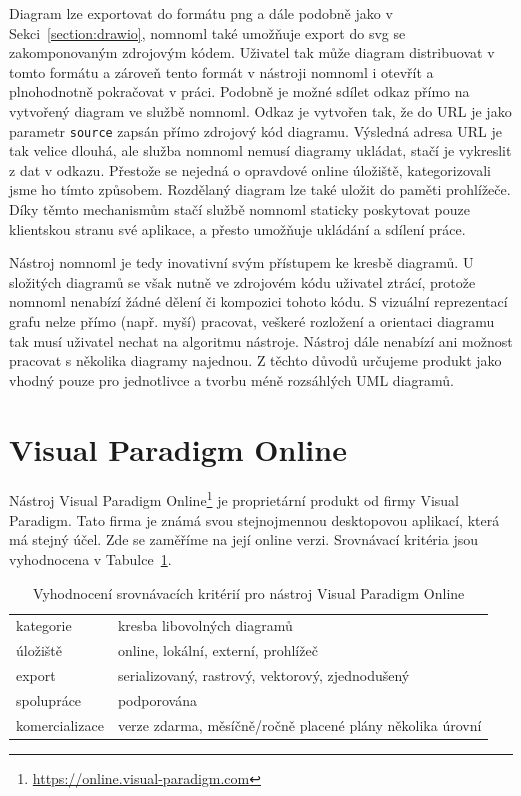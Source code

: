 Diagram lze exportovat do formátu \acrshort{png} a dále podobně jako v Sekci~\ref{section:drawio}, nomnoml také umožňuje export do \acrshort{svg} se zakomponovaným zdrojovým kódem.
Uživatel tak může diagram distribuovat v tomto formátu a zároveň tento formát v nástroji nomnoml i otevřít a plnohodnotně pokračovat v práci.
Podobně je možné sdílet odkaz přímo na vytvořený diagram ve službě nomnoml.
Odkaz je vytvořen tak, že do URL je jako parametr \texttt{source} zapsán přímo zdrojový kód diagramu.
Výsledná adresa URL je tak velice dlouhá, ale služba nomnoml nemusí diagramy ukládat, stačí je vykreslit z dat v odkazu.
Přestože se nejedná o opravdové online úložiště, kategorizovali jsme ho tímto způsobem.
Rozdělaný diagram lze také uložit do paměti prohlížeče.
Díky těmto mechanismům stačí službě nomnoml staticky poskytovat pouze klientskou stranu své aplikace, a přesto umožňuje ukládání a sdílení práce.

Nástroj nomnoml je tedy inovativní svým přístupem ke kresbě diagramů.
U složitých diagramů se však nutně ve zdrojovém kódu uživatel ztrácí, protože nomnoml nenabízí žádné dělení či kompozici tohoto kódu.
S vizuální reprezentací grafu nelze přímo (např. myší) pracovat, veškeré rozložení a orientaci diagramu tak musí uživatel nechat na algoritmu nástroje.
Nástroj dále nenabízí ani možnost pracovat s několika diagramy najednou.
Z těchto důvodů určujeme produkt jako vhodný pouze pro jednotlivce a tvorbu méně rozsáhlých UML diagramů.

\section{Visual Paradigm Online}

Nástroj Visual Paradigm Online\footnote{\url{https://online.visual-paradigm.com}} je proprietární produkt od firmy Visual Paradigm.
Tato firma je známá svou stejnojmennou desktopovou aplikací, která má stejný účel. Zde se zaměříme na její online verzi.
Srovnávací kritéria jsou vyhodnocena v Tabulce~\ref{tab:comparison-vpo}.

\begin{table}[!htb]
  \begin{tabularx}{\textwidth}{lX}\toprule
    kategorie      & kresba libovolných diagramů                                 \\
    úložiště       & online, lokální, externí, prohlížeč                         \\
    export         & serializovaný, rastrový, vektorový, zjednodušený            \\
    spolupráce     & podporována                                                 \\
    komercializace & verze zdarma, měsíčně/ročně placené plány několika úro\-vní
    \\\bottomrule
  \end{tabularx}
  \caption{Vyhodnocení srovnávacích kritérií pro nástroj Visual Paradigm Online}
  \label{tab:comparison-vpo}
\end{table}

